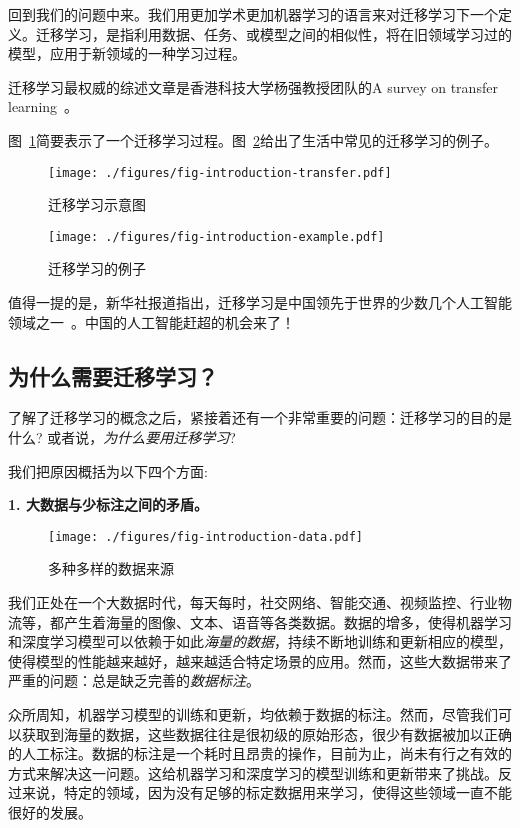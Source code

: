 回到我们的问题中来。我们用更加学术更加机器学习的语言来对迁移学习下一个定义。迁移学习，是指利用数据、任务、或模型之间的相似性，将在旧领域学习过的模型，应用于新领域的一种学习过程。

迁移学习最权威的综述文章是香港科技大学杨强教授团队的A survey on transfer learning~\cite{pan2010survey}。

图~\ref{fig-transfer}简要表示了一个迁移学习过程。图~\ref{fig-example}给出了生活中常见的迁移学习的例子。

\begin{figure}[htbp]
	\centering
	\texttt{[image: ./figures/fig-introduction-transfer.pdf]}
	\caption{迁移学习示意图}
	\label{fig-transfer}
\end{figure}

\begin{figure}[htbp]
	\centering
	\texttt{[image: ./figures/fig-introduction-example.pdf]}
	\caption{迁移学习的例子}
	\label{fig-example}
\end{figure}

值得一提的是，新华社报道指出，迁移学习是中国领先于世界的少数几个人工智能领域之一~\cite{xinhua}。中国的人工智能赶超的机会来了！


\subsection{为什么需要迁移学习？}

了解了迁移学习的概念之后，紧接着还有一个非常重要的问题：迁移学习的目的是什么? 或者说，\textit{为什么要用迁移学习}?

我们把原因概括为以下四个方面:

\textbf{1. 大数据与少标注之间的矛盾。}

\begin{figure}[htbp]
	\centering
	\texttt{[image: ./figures/fig-introduction-data.pdf]}
	\caption{多种多样的数据来源}
	\label{fig-introduction-data}
\end{figure}

我们正处在一个大数据时代，每天每时，社交网络、智能交通、视频监控、行业物流等，都产生着海量的图像、文本、语音等各类数据。数据的增多，使得机器学习和深度学习模型可以依赖于如此\textit{海量的数据}，持续不断地训练和更新相应的模型，使得模型的性能越来越好，越来越适合特定场景的应用。然而，这些大数据带来了严重的问题：总是缺乏完善的\textit{数据标注}。

众所周知，机器学习模型的训练和更新，均依赖于数据的标注。然而，尽管我们可以获取到海量的数据，这些数据往往是很初级的原始形态，很少有数据被加以正确的人工标注。数据的标注是一个耗时且昂贵的操作，目前为止，尚未有行之有效的方式来解决这一问题。这给机器学习和深度学习的模型训练和更新带来了挑战。反过来说，特定的领域，因为没有足够的标定数据用来学习，使得这些领域一直不能很好的发展。

